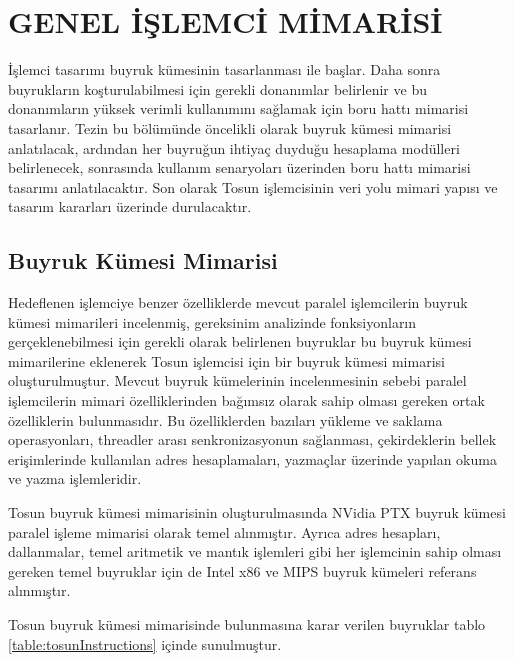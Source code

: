 \chapter{GENEL İŞLEMCİ MİMARİSİ}
İşlemci tasarımı buyruk kümesinin tasarlanması ile başlar. Daha sonra buyrukların koşturulabilmesi için gerekli donanımlar belirlenir ve bu donanımların yüksek verimli kullanımını sağlamak için boru hattı mimarisi tasarlanır. Tezin bu bölümünde öncelikli olarak buyruk kümesi mimarisi anlatılacak, ardından her buyruğun ihtiyaç duyduğu hesaplama modülleri belirlenecek, sonrasında kullanım senaryoları üzerinden boru hattı mimarisi tasarımı anlatılacaktır. Son olarak Tosun işlemcisinin veri yolu mimari yapısı ve tasarım kararları üzerinde durulacaktır.\par

\section{Buyruk Kümesi Mimarisi}
Hedeflenen işlemciye benzer özelliklerde mevcut paralel işlemcilerin buyruk kümesi mimarileri incelenmiş, gereksinim analizinde fonksiyonların gerçeklenebilmesi için gerekli olarak belirlenen buyruklar bu buyruk kümesi mimarilerine eklenerek Tosun işlemcisi için bir buyruk kümesi mimarisi oluşturulmuştur. Mevcut buyruk kümelerinin incelenmesinin sebebi paralel işlemcilerin mimari özelliklerinden bağımsız olarak sahip olması gereken ortak özelliklerin bulunmasıdır. Bu özelliklerden bazıları yükleme ve saklama operasyonları, threadler arası senkronizasyonun sağlanması, çekirdeklerin bellek erişimlerinde kullanılan adres hesaplamaları, yazmaçlar üzerinde yapılan okuma ve yazma işlemleridir. \par

Tosun buyruk kümesi mimarisinin oluşturulmasında NVidia PTX \cite{nvidiaPTXISA} buyruk kümesi paralel işleme mimarisi olarak temel alınmıştır. Ayrıca adres hesapları, dallanmalar, temel aritmetik ve mantık işlemleri gibi her işlemcinin sahip olması gereken temel buyruklar için de Intel x86 \cite{x86ISA} ve MIPS \cite{MIPSISA} buyruk kümeleri referans alınmıştır. \par

Tosun buyruk kümesi mimarisinde bulunmasına karar verilen buyruklar tablo \ref{table:tosunInstructions} içinde sunulmuştur. 



